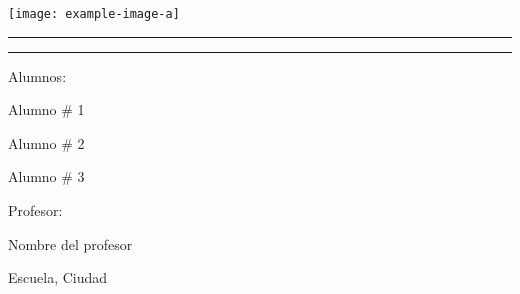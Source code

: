 \begin{titlepage}
    \begin{addmargin}[-1.5cm]{-1.5cm}
        \centering %
        

        \hfill\texttt{[image: example-image-a]}
        \vspace*{0.05\textheight} %
        
            
        \color{coolred}
        \rule{0.8\textwidth}{2pt}
        \vspace*{\baselineskip}

        \textsf{\textbf{\huge \color{mytitlecolor}{\materia}}}  
        \vspace*{0.05\textheight}

        {\Huge{\textsf{\textbf{\color{mytitlecolor}{\trabajo}}}}}
        \vspace*{\baselineskip}

        \rule{0.8\textwidth}{2pt}

        \vspace*{0.03\textheight}

        
        \color{black}
        {\large \textsf{Alumnos:}}  \vspace*{1.5\baselineskip}

        {\Large Alumno \# 1} \vspace*{\baselineskip}

        {\Large Alumno \# 2} \vspace*{\baselineskip}

        {\Large Alumno \# 3} \vspace*{2\baselineskip}

        {\large \textsf{Profesor:}} \vspace*{1.5\baselineskip}

        {\Large Nombre del profesor} \vspace*{2\baselineskip}

        {\large \textsf{Escuela, Ciudad}} \vspace*{\baselineskip}

        {\large \textsf{\fechaentrega}}
        
        \vspace*{\fill}
    \end{addmargin}
\end{titlepage}
